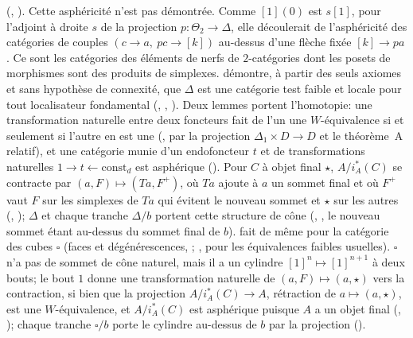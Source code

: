 (, ). Cette asphéricité n'est pas démontrée. Comme $[1](0)$ est $s[1]$, pour l'adjoint à droite $s$ de la projection $p\colon\Theta_2\to\Delta$, elle découlerait de l'asphéricité des catégories de couples $(c\to a,\ pc\to[k])$ au-dessus d'une flèche fixée $[k]\to pa$. Ce sont les catégories des éléments de nerfs de $2$-catégories dont les posets de morphismes sont des produits de simplexes.  démontre, à partir des seuls axiomes et sans hypothèse de connexité, que $\Delta$ est une catégorie test faible et locale pour tout localisateur fondamental (, , ). Deux lemmes portent l'homotopie: une transformation naturelle entre deux foncteurs fait de l'un une $W$-équivalence si et seulement si l'autre en est une (, par la projection $\Delta_1\times D\to D$ et le théorème~A relatif), et une catégorie munie d'un endofoncteur $t$ et de transformations naturelles $1\to t\leftarrow\mathrm{const}_d$ est asphérique (). Pour $C$ à objet final $\star$, $A/i_A^*(C)$ se contracte par $(a,F)\mapsto(Ta,F^+)$, où $Ta$ ajoute à $a$ un sommet final et où $F^+$ vaut $F$ sur les simplexes de $Ta$ qui évitent le nouveau sommet et $\star$ sur les autres (, ); $\Delta$ et chaque tranche $\Delta/b$ portent cette structure de cône (, , le nouveau sommet étant au-dessus du sommet final de $b$).  fait de même pour la catégorie des cubes $\square$ (faces et dégénérescences, ; , \cite[cor.~8.4.13]{cisinski-308} pour les équivalences faibles usuelles). $\square$ n'a pas de sommet de cône naturel, mais il a un cylindre $[1]^n\mapsto[1]^{n+1}$ à deux bouts; le bout $1$ donne une transformation naturelle de $(a,F)\mapsto(a,\star)$ vers la contraction, si bien que la projection $A/i_A^*(C)\to A$, rétraction de $a\mapsto(a,\star)$, est une $W$-équivalence, et $A/i_A^*(C)$ est asphérique puisque $A$ a un objet final (, ); chaque tranche $\square/b$ porte le cylindre au-dessus de $b$ par la projection ().
